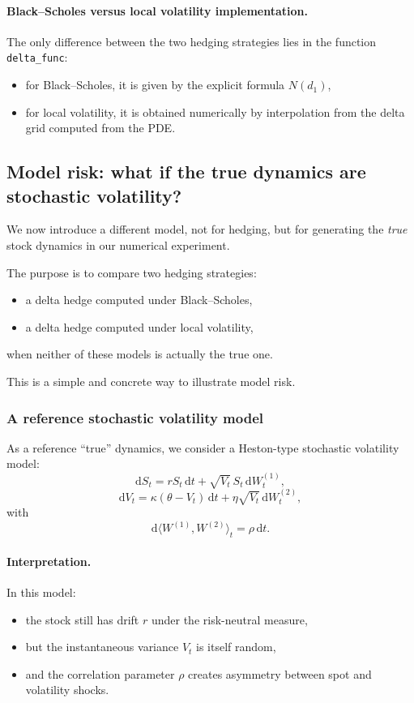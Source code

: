 \documentclass[11pt]{article}
\theoremstyle{plain}
\theoremstyle{definition}
\theoremstyle{remark}
\begin{document}
\paragraph{Black--Scholes versus local volatility implementation.}
The only difference between the two hedging strategies lies in the
function \texttt{delta\_func}:
\begin{itemize}[leftmargin=1.4em]
    \item for Black--Scholes, it is given by the explicit formula
    \(N(d_1)\),
    \item for local volatility, it is obtained numerically by
    interpolation from the delta grid computed from the PDE.
\end{itemize}

\subsection{Model risk: what if the true dynamics are stochastic volatility?}

We now introduce a different model, not for hedging, but for generating
the \emph{true} stock dynamics in our numerical experiment.

The purpose is to compare two hedging strategies:
\begin{itemize}[leftmargin=1.4em]
    \item a delta hedge computed under Black--Scholes,
    \item a delta hedge computed under local volatility,
\end{itemize}
when neither of these models is actually the true one.

This is a simple and concrete way to illustrate model risk.

\subsubsection{A reference stochastic volatility model}

As a reference ``true'' dynamics, we consider a Heston-type stochastic
volatility model:
\[
\mathrm{d}S_t
=
rS_t\,\mathrm{d}t
+
\sqrt{V_t}\,S_t\,\mathrm{d}W_t^{(1)},
\]
\[
\mathrm{d}V_t
=
\kappa(\theta-V_t)\,\mathrm{d}t
+
\eta\sqrt{V_t}\,\mathrm{d}W_t^{(2)},
\]
with
\[
\mathrm{d}\langle W^{(1)},W^{(2)}\rangle_t=\rho\,\mathrm{d}t.
\]

\paragraph{Interpretation.}
In this model:
\begin{itemize}[leftmargin=1.4em]
    \item the stock still has drift \(r\) under the risk-neutral measure,
    \item but the instantaneous variance \(V_t\) is itself random,
    \item and the correlation parameter \(\rho\) creates asymmetry between
    spot and volatility shocks.
\end{itemize}
\end{document}
